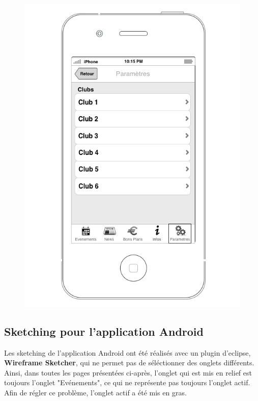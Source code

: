 \documentclass[a4paper, 11px]{article}
\begin{document}
\begin{figure}[htbp]
\begin{minipage}[c]{.50\linewidth}
\begin{center}
			\includegraphics[scale=0.3]{../../Sketch/iOS/parametres_detail.png}
		\end{center}
	\end{minipage}
\end{figure}
\vfill
\clearpage


\subsection{Sketching pour l'application Android}
Les sketching de l'application Android ont été réalisés avec un plugin d'eclipse, \textbf{Wireframe Sketcher}, qui ne permet pas de séléctionner des onglets différents. Ainsi, dans toutes les pages présentées ci-après, l'onglet qui est mis en relief est toujours l'onglet "Evénements", ce qui ne représente pas toujours l'onglet actif. Afin de régler ce problème, l'onglet actif a été mis en gras.
\end{document}
